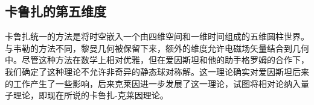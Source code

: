 \subsection{卡鲁扎的第五维度}

卡鲁扎统一的方法是将时空嵌入一个由四维空间和一维时间组成的五维圆柱世界。与韦勒的方法不同，黎曼几何被保留下来，额外的维度允许电磁场矢量结合到几何中。尽管这种方法在数学上相对优雅，但在爱因斯坦和他的助手格罗姆的合作下，我们确定了这种理论不允许非奇异的静态球对称解。这一理论确实对爱因斯坦后来的工作产生了一些影响，后来克莱因进一步发展了这一理论，试图将相对论纳入量子理论，即现在所说的卡鲁扎-克莱因理论。